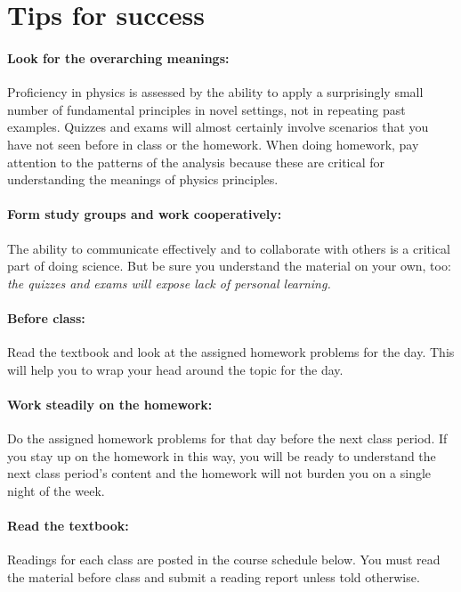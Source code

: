 \section*{Tips for success}

\paragraph{Look for the overarching meanings:} Proficiency in physics is assessed by the ability to apply a surprisingly small number of fundamental principles in novel settings, not in repeating past examples. Quizzes and exams will almost certainly involve scenarios that you have not seen before in class or the homework. When doing homework, pay attention to the patterns of the analysis because these are critical for understanding the meanings of physics principles. 
\paragraph{Form study groups and work cooperatively:} The ability to communicate 
effectively and to collaborate with others is a critical part of doing science.  But be sure you understand the material on your own, too: \emph{the quizzes and exams will expose lack of personal learning. }
\paragraph{Before class:} Read the textbook and look at the assigned homework problems for the day. This will help you to wrap your head around the topic for the day.
\paragraph{Work steadily on the homework:} Do the assigned homework problems for that day before the next class period. If you stay up on the homework in this way, you will be ready to understand the next class period’s content and the homework will not burden you on a single night of the week.
\paragraph{Read the textbook:} Readings for each class are posted in the course schedule below. You must read the material before class and submit a reading report unless told otherwise.